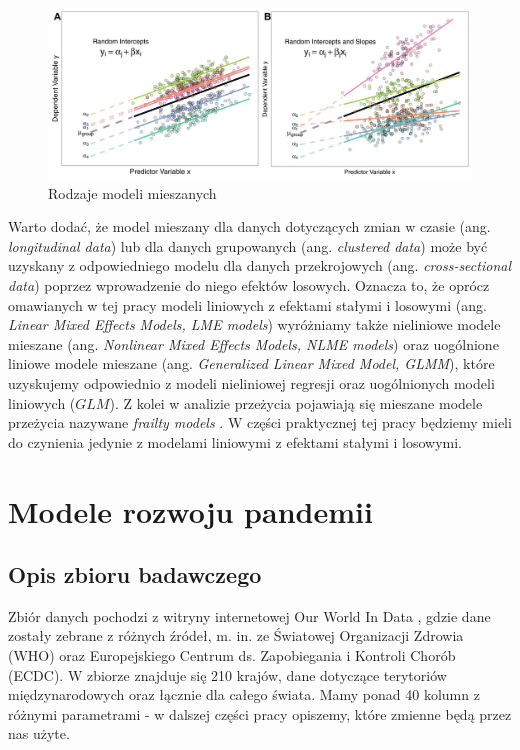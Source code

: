\documentclass[12pt]{mwbk}
\theoremstyle{plain}
\theoremstyle{definition}
\theoremstyle{remark}
\newcommand\zrodlo[1]{\par\vspace{-3mm}{\small\textit{Źródło: }#1 }}
\begin{document}
 
 \begin{figure}[!ht]
 	\centering
 	\includegraphics[width=\linewidth]{rys/random_types.jpg}
 	\caption{Rodzaje modeli mieszanych}
 	\label{fig:random_types}
 	\zrodlo{\cite{brief}}
 \end{figure}

 Warto dodać, że model mieszany dla danych dotyczących zmian w czasie (ang. \textit{longitudinal data}) lub dla danych grupowanych (ang. \textit{clustered data}) może być uzyskany z odpowiedniego modelu dla danych przekrojowych (ang. \textit{cross-sectional data}) poprzez wprowadzenie do niego efektów losowych. Oznacza to, że oprócz omawianych w tej pracy modeli liniowych z efektami stałymi i losowymi (ang. \textit{Linear Mixed Effects Models, LME models}) wyróżniamy także nieliniowe modele mieszane (ang. \textit{Nonlinear Mixed Effects Models, NLME models}) oraz uogólnione liniowe modele mieszane (ang. \textit{Generalized Linear Mixed Model, GLMM}), które uzyskujemy odpowiednio z modeli nieliniowej regresji oraz uogólnionych modeli liniowych ($GLM$). Z kolei w analizie przeżycia pojawiają się mieszane modele przeżycia nazywane \textit{frailty models} \cite{insurance}. W części praktycznej tej pracy będziemy mieli do czynienia jedynie z modelami liniowymi z efektami stałymi i losowymi.
 
\chapter{Modele rozwoju pandemii}
\section{Opis zbioru badawczego}

Zbiór danych pochodzi z witryny internetowej Our World In Data \cite{owid}, gdzie dane zostały zebrane z różnych źródeł, m. in. ze Światowej Organizacji Zdrowia (WHO) oraz Europejskiego Centrum ds. Zapobiegania i Kontroli Chorób (ECDC). W zbiorze znajduje się 210 krajów, dane dotyczące terytoriów międzynarodowych oraz łącznie dla całego świata. Mamy ponad 40 kolumn z różnymi parametrami - w dalszej części pracy opiszemy, które zmienne będą przez nas użyte.
\end{document}
